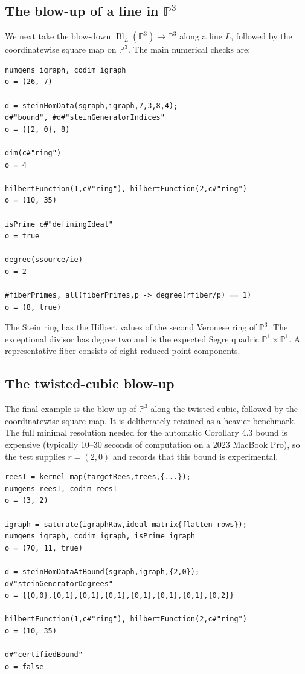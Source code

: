 \documentclass[a4paper,11pt]{article}
\begin{document}
\subsection{The blow-up of a line in $\mathbb{P}^3$}

We next take the blow-down $\operatorname{Bl}_L(\mathbb{P}^3)\to\mathbb{P}^3$ along a
line $L$, followed by the coordinatewise square map on $\mathbb{P}^3$. The main numerical
checks are:

\begin{verbatim}
numgens igraph, codim igraph
o = (26, 7)

d = steinHomData(sgraph,igraph,7,3,8,4);
d#"bound", #d#"steinGeneratorIndices"
o = ({2, 0}, 8)

dim(c#"ring")
o = 4

hilbertFunction(1,c#"ring"), hilbertFunction(2,c#"ring")
o = (10, 35)

isPrime c#"definingIdeal"
o = true

degree(ssource/ie)
o = 2

#fiberPrimes, all(fiberPrimes,p -> degree(rfiber/p) == 1)
o = (8, true)
\end{verbatim}

The Stein ring has the Hilbert values of the second Veronese ring of $\mathbb{P}^3$.
The exceptional divisor has degree two and is the expected Segre quadric
$\mathbb{P}^1\times\mathbb{P}^1$. A representative fiber consists of eight reduced point
components.

\subsection{The twisted-cubic blow-up}

The final example is the blow-up of $\mathbb{P}^3$ along the twisted cubic, followed by
the coordinatewise square map. It is deliberately retained as a heavier benchmark.
The full minimal resolution needed for the automatic Corollary 4.3 bound is expensive
(typically 10--30 seconds of computation on a 2023 MacBook Pro), so the test supplies
$r=(2,0)$ and records that this bound is experimental.

\begin{verbatim}
reesI = kernel map(targetRees,trees,{...});
numgens reesI, codim reesI
o = (3, 2)

igraph = saturate(igraphRaw,ideal matrix{flatten rows});
numgens igraph, codim igraph, isPrime igraph
o = (70, 11, true)

d = steinHomDataAtBound(sgraph,igraph,{2,0});
d#"steinGeneratorDegrees"
o = {{0,0},{0,1},{0,1},{0,1},{0,1},{0,1},{0,1},{0,2}}

hilbertFunction(1,c#"ring"), hilbertFunction(2,c#"ring")
o = (10, 35)

d#"certifiedBound"
o = false
\end{verbatim}
\end{document}
